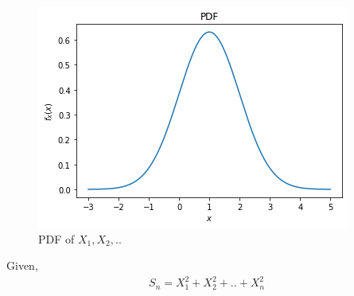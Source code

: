 \documentclass[journal,12pt,twocolumn]{IEEEtran}
\begin{document}
\begin{figure}[h]
 \centering
\includegraphics[width=\columnwidth]{PDF.png}
 \caption{PDF of $X_{1},X_{2},..$}
    \label{fig:my_label}
\end{figure}
Given,
\begin{align}
    S_{n}=X_{1}^{2}+X_{2}^2+..+X_{n}^2
\end{align}
\newpage
\end{document}
